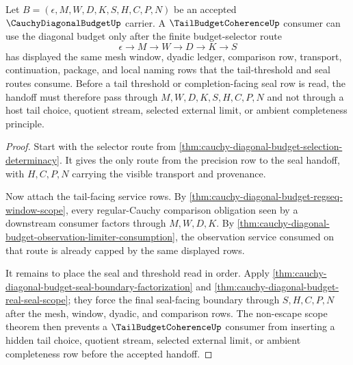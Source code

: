 \begin{theorem}
\label{thm:cauchy-diagonal-budget-tail-coherence-handoff}
Let $B=(\epsilon,M,W,D,K,S,H,C,P,N)$ be an accepted $\CauchyDiagonalBudgetUp$ carrier. A $\TailBudgetCoherenceUp$ consumer can use the diagonal budget only after the finite budget-selector route
$$
\epsilon \to M \to W \to D \to K \to S
$$
has displayed the same mesh window, dyadic ledger, comparison row, transport, continuation, package, and local naming rows that the tail-threshold and seal routes consume. Before a tail threshold or completion-facing seal row is read, the handoff must therefore pass through $M,W,D,K,S,H,C,P,N$ and not through a host tail choice, quotient stream, selected external limit, or ambient completeness principle.
\end{theorem}
\begin{proof}
Start with the selector route from \autoref{thm:cauchy-diagonal-budget-selection-determinacy}. It gives the only route from the precision row to the seal handoff, with $H,C,P,N$ carrying the visible transport and provenance.

Now attach the tail-facing service rows. By \autoref{thm:cauchy-diagonal-budget-regseq-window-scope}, every regular-Cauchy comparison obligation seen by a downstream consumer factors through $M,W,D,K$. By \autoref{thm:cauchy-diagonal-budget-observation-limiter-consumption}, the observation service consumed on that route is already capped by the same displayed rows.

It remains to place the seal and threshold read in order. Apply \autoref{thm:cauchy-diagonal-budget-seal-boundary-factorization} and \autoref{thm:cauchy-diagonal-budget-real-seal-scope}; they force the final seal-facing boundary through $S,H,C,P,N$ after the mesh, window, dyadic, and comparison rows. The non-escape scope theorem then prevents a $\TailBudgetCoherenceUp$ consumer from inserting a hidden tail choice, quotient stream, selected external limit, or ambient completeness row before the accepted handoff.
\end{proof}

